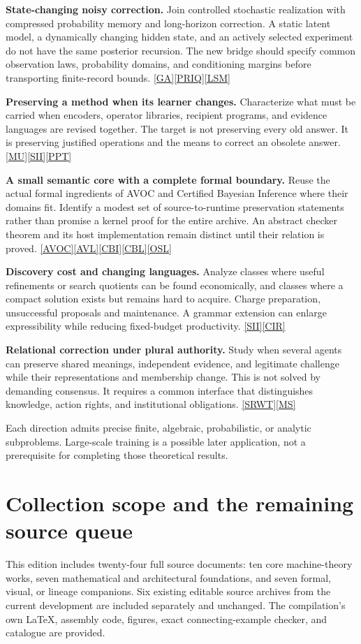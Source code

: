 \documentclass[11pt,oneside]{article}
\newcommand{\src}[1]{\hyperlink{cat:#1}{\textsf{[#1]}}}
\begin{document}
\textbf{State-changing noisy correction.} Join controlled stochastic realization with compressed probability memory and long-horizon correction. A static latent model, a dynamically changing hidden state, and an actively selected experiment do not have the same posterior recursion. The new bridge should specify common observation laws, probability domains, and conditioning margins before transporting finite-record bounds. \src{GA}\src{PRIQ}\src{LSM}

\textbf{Preserving a method when its learner changes.} Characterize what must be carried when encoders, operator libraries, recipient programs, and evidence languages are revised together. The target is not preserving every old answer. It is preserving justified operations and the means to correct an obsolete answer. \src{MU}\src{SII}\src{PPT}

\textbf{A small semantic core with a complete formal boundary.} Reuse the actual formal ingredients of AVOC and Certified Bayesian Inference where their domains fit. Identify a modest set of source-to-runtime preservation statements rather than promise a kernel proof for the entire archive. An abstract checker theorem and its host implementation remain distinct until their relation is proved. \src{AVOC}\src{AVL}\src{CBI}\src{CBL}\src{OSL}

\textbf{Discovery cost and changing languages.} Analyze classes where useful refinements or search quotients can be found economically, and classes where a compact solution exists but remains hard to acquire. Charge preparation, unsuccessful proposals and maintenance. A grammar extension can enlarge expressibility while reducing fixed-budget productivity. \src{SII}\src{CIR}

\textbf{Relational correction under plural authority.} Study when several agents can preserve shared meanings, independent evidence, and legitimate challenge while their representations and membership change. This is not solved by demanding consensus. It requires a common interface that distinguishes knowledge, action rights, and institutional obligations. \src{SRWT}\src{MS}

Each direction admits precise finite, algebraic, probabilistic, or analytic subproblems. Large-scale training is a possible later application, not a prerequisite for completing those theoretical results.

\section{Collection scope and the remaining source queue}
This edition includes twenty-four full source documents: ten core machine-theory works, seven mathematical and architectural foundations, and seven formal, visual, or lineage companions. Six existing editable source archives from the current development are included separately and unchanged. The compilation's own LaTeX, assembly code, figures, exact connecting-example checker, and catalogue are provided.
\end{document}
